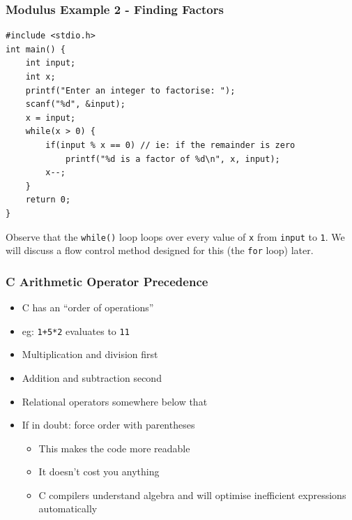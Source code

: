 \documentclass[14pt]{beamer}
\begin{document}
\begin{frame}[fragile]
\frametitle{Modulus Example 2 - Finding Factors}

\begin{lstlisting}[style=CStyle,basicstyle=\ttfamily\scriptsize]
#include <stdio.h>
int main() {
	int input;
	int x;
	printf("Enter an integer to factorise: ");
	scanf("%d", &input);
	x = input;
	while(x > 0) {
		if(input % x == 0) // ie: if the remainder is zero
			printf("%d is a factor of %d\n", x, input);
		x--;
	}
	return 0;
}
\end{lstlisting}
{\small
Observe that the \texttt{while()} loop loops over every value of \texttt{x} from \texttt{input} to \texttt{1}. We will discuss a flow control method designed for this (the \texttt{for} loop) later.
}
\end{frame}

\begin{frame}
\frametitle{C Arithmetic Operator Precedence}
\begin{itemize}
\item C has an ``order of operations''
\item eg: \texttt{1+5*2} evaluates to \texttt{11}
\item Multiplication and division first
\item Addition and subtraction second
\item Relational operators somewhere below that
\item If in doubt: force order with parentheses
	\begin{itemize}
		\item This makes the code more readable
		\item It doesn't cost you anything
		\item C compilers understand algebra and will optimise inefficient expressions automatically
	\end{itemize}

\end{itemize}
\end{frame}
\end{document}
